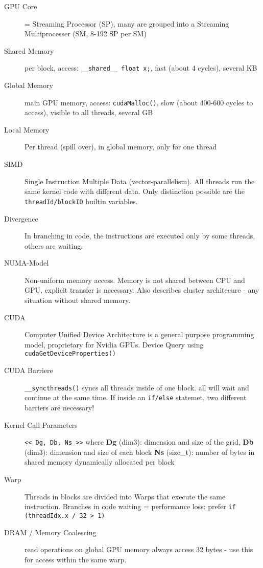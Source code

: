 \begin{description}
  \item[GPU Core]= Streaming Processor (SP), many are grouped into a Streaming Multiprocesser (SM, 8-192 SP per SM)
  \item[Shared Memory] per block, access: \texttt{\_\_shared\_\_ float x;}, fast (about 4 cycles), several KB
  \item[Global Memory] main GPU memory,	access: \texttt{cudaMalloc()}, slow (about 400-600 cycles to access), visible to all threads, several GB
  \item[Local Memory] Per thread (spill over), in global memory, only for one thread
  \item[SIMD] Single Instruction Multiple Data (vector-parallelism). All threads run the same kernel code with different data. Only distinction possible are the \texttt{threadId/blockID} builtin variables. 
  \item[Divergence] In branching in code, the instructions are executed only by some threads, others are waiting.
  
  \item[NUMA-Model] Non-uniform memory access. Memory is not shared between CPU and GPU, explicit transfer is necessary. Also describes cluster architecure - any situation without shared memory.
  
  \item[CUDA] Computer Unified Device Architecture is a general purpose programming model, proprietary for Nvidia GPUs. Device Query using \texttt{cudaGetDeviceProperties()}
  
  \item[CUDA Barriere] \texttt{\_\_syncthreads()} syncs all threads inside of one block. all will wait and continue at the same time. If inside an \texttt{if/else} statemet, two different barriers are necessary!
  \item[Kernel Call Parameters] \lstinline|<< Dg, Db, Ns >>| where 
  \textbf{Dg} (dim3): dimension and size of the grid,
  \textbf{Db} (dim3): dimension and size of each block
  \textbf{Ns} (size\_t): number of bytes in shared memory dynamically allocated per block
  \item[Warp] Threads in blocks are divided into Warps that execute the same instruction. Branches in code waiting = performance loss: prefer \texttt{if (threadIdx.x / 32 > 1)}
  \item[DRAM / Memory Coalescing] read operations on global GPU memory always access 32 bytes - use this for access within the same warp. 
\end{description}

